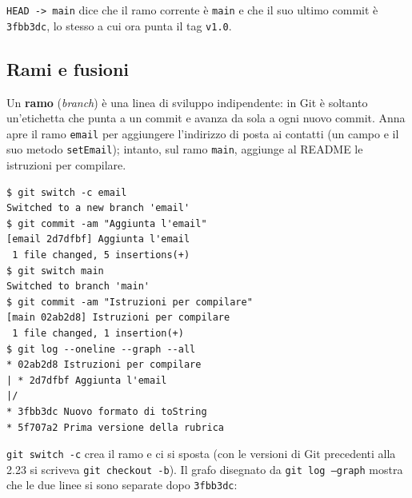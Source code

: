 \texttt{HEAD -> main} dice che il ramo corrente è \texttt{main} e che il suo ultimo commit è \texttt{3fbb3dc}, lo stesso
a cui ora punta il tag \texttt{v1.0}.

\subsection{Rami e fusioni}

Un \textbf{ramo} (\textit{branch}) è una linea di sviluppo indipendente: in Git è soltanto un'etichetta che punta a un
commit e avanza da sola a ogni nuovo commit. Anna apre il ramo \texttt{email} per aggiungere l'indirizzo di posta ai
contatti (un campo e il suo metodo \texttt{setEmail}); intanto, sul ramo \texttt{main}, aggiunge al README le
istruzioni per compilare.

\begin{lstlisting}[style=shell, name=Terminale di Anna, deletestring={[b]'}, deletekeywords={java}]
$ git switch -c email
Switched to a new branch 'email'
$ git commit -am "Aggiunta l'email"
[email 2d7dfbf] Aggiunta l'email
 1 file changed, 5 insertions(+)
$ git switch main
Switched to branch 'main'
$ git commit -am "Istruzioni per compilare"
[main 02ab2d8] Istruzioni per compilare
 1 file changed, 1 insertion(+)
$ git log --oneline --graph --all
* 02ab2d8 Istruzioni per compilare
| * 2d7dfbf Aggiunta l'email
|/
* 3fbb3dc Nuovo formato di toString
* 5f707a2 Prima versione della rubrica
\end{lstlisting}

\texttt{git switch -c} crea il ramo e ci si sposta (con le versioni di Git precedenti alla 2.23 si scriveva
\texttt{git checkout -b}). Il grafo disegnato da \texttt{git log --graph} mostra che le due linee si sono separate dopo
\texttt{3fbb3dc}:

\begin{center}
\end{center}

